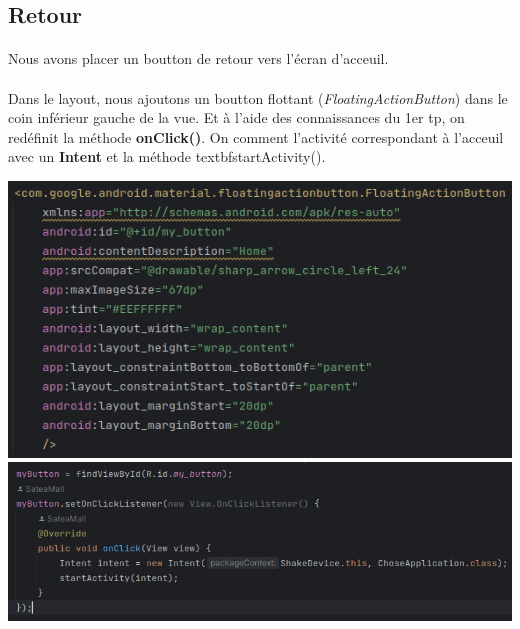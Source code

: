 \documentclass[a4paper]{article}
\begin{document}
\begin{multicols}{2}
            \subsection{Retour}
                \paragraph{}
                    Nous avons placer un boutton de retour vers l'écran d'acceuil.
                    
                \paragraph{}
                    Dans le layout, nous ajoutons un boutton flottant (\emph{FloatingActionButton}) dans le coin inférieur gauche de la vue.
                    Et à l'aide des connaissances du 1er tp, on redéfinit la méthode \textbf{onClick()}. On comment l'activité correspondant à l'acceuil avec un \textbf{Intent} et la méthode textbf{startActivity()}.

                    \noindent\includegraphics[width=.49\textwidth]{button/boutton}
                    \includegraphics[width=.49\textwidth]{button/onClick}

    \end{multicols}
\end{document}
